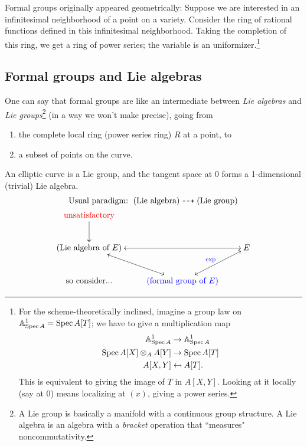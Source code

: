 Formal groups originally appeared geometrically: Suppose we are interested in an infinitesimal neighborhood of a point on a variety. Consider the ring of rational functions defined in this infinitesimal neighborhood. Taking the completion of this ring, we get a ring of power series; the variable is an uniformizer.\footnote{For the scheme-theoretically inclined, imagine a group law on $\mathbb{A}^1_{\operatorname{Spec} A}=\operatorname{Spec} A[T]$; we have to give a multiplication map
\begin{align*}
\mathbb{A}^1_{\operatorname{Spec} A}&\to \mathbb{A}^1_{\operatorname{Spec} A} \\
\operatorname{Spec} A[X]\otimes_A A[Y] & \to \operatorname{Spec} A[T]\\
A[X,Y] & \mapsfrom A[T].
\end{align*}
This is equivalent to giving the image of $T$ in $A[X,Y]$. Looking at it locally (say at 0) means localizing at $(x)$, giving a power series. 
}

\subsection{Formal groups and Lie algebras}

 One can say that formal groups are like an intermediate between {\it Lie algebras }and {\it Lie groups}\footnote{A Lie group is basically a manifold with a continuous group structure. A Lie algebra is an algebra with a {\it bracket} operation that ``measures" noncommutativity.} (in a way we won't make precise), going from 
\begin{enumerate}
\item
the complete local ring (power series ring) $R$ at a point, to
\item
a subset of points on the curve.
\end{enumerate}
An elliptic curve is a Lie group, and the tangent space at 0 forms a 1-dimensional (trivial) Lie algebra.
\begin{gather*}
\text{Usual paradigm: }\pat{Lie algebra} \dashrightarrow \pat{Lie group}\\
\xymatrix{
\fixme{\text{unsatisfactory}}\ar[d] &&\\
\pat{Lie algebra of $E$}
\ar@{<->}[rr] \ar@{<->}[rd]&&E\\
\text{so consider...}& {\color{blue}\pat{formal group of $E$}} \ar@{<->}[ru]^{\color{blue}\text{exp}}&
}
\end{gather*}


